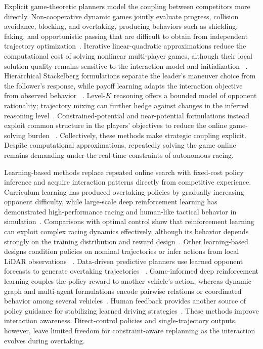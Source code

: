 \documentclass[sensors,article,submit,moreauthors]{Definitions/mdpi}
\begin{document}
Explicit game-theoretic planners model the coupling between competitors more
directly. Non-cooperative dynamic games jointly evaluate progress, collision
avoidance, blocking, and overtaking, producing behaviors such as shielding,
faking, and opportunistic passing that are difficult to obtain from independent
trajectory optimization~\cite{liniger2019game,wang2021game}. 
Iterative linear-quadratic approximations reduce the computational cost of
solving nonlinear multi-player games, although their local solution quality
remains sensitive to the interaction model and initialization
~\cite{fridovich2020ilqgames}.
Hierarchical Stackelberg formulations separate
the leader's maneuver choice from the follower's response, while payoff
learning adapts the interaction objective from observed behavior
~\cite{ji2023hierarchicalgame,lopez2022payoff}. Level-$K$ reasoning offers a
bounded model of opponent rationality; trajectory mixing can further hedge
against changes in the inferred reasoning level~\cite{ji2024competition}.
Constrained-potential and near-potential formulations instead exploit common
structure in the players' objectives to reduce the online game-solving burden
~\cite{jia2023bayesian,kalaria2025alpha}.  
Collectively, these methods make strategic coupling explicit. Despite
computational approximations, repeatedly solving the game online remains
demanding under the real-time constraints of autonomous racing.

Learning-based methods replace repeated online search with fixed-cost policy
inference and acquire interaction patterns directly from competitive
experience. 
Curriculum learning has produced overtaking policies by gradually
increasing opponent difficulty, while large-scale deep reinforcement learning
has demonstrated high-performance racing and human-like tactical behavior in
simulation~\cite{song2021overtaking,fuchs2021superhuman,wurman2022gtsophy}.
Comparisons with optimal control show that reinforcement learning can exploit
complex racing dynamics effectively, although its behavior depends strongly on
the training distribution and reward design~\cite{lin2023limit}. 
Other learning-based designs condition policies on nominal trajectories or
infer actions from local LiDAR observations
~\cite{evans2023trajectory,hell2024lidar}. Data-driven predictive planners use
learned opponent forecasts to generate overtaking trajectories
~\cite{baumann2025predictive}.
Game-informed deep reinforcement learning couples the
policy reward to another vehicle's action, whereas dynamic-graph and
multi-agent formulations encode pairwise relations or coordinated behavior
among several vehicles~\cite{yuan2022drlgame,hu2023dynamicgraph,
han2024marl}. 
Human feedback provides another source of policy guidance for stabilizing
learned driving strategies~\cite{guo2025rlhf}.
These methods improve interaction awareness. Direct-control policies and
single-trajectory outputs, however, leave limited freedom for constraint-aware
replanning as the interaction evolves during overtaking.
\end{document}
